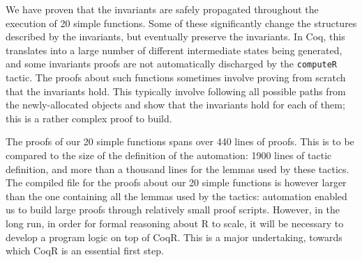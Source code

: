 \documentclass[
    sigplan,
    10pt,
    review, %
    natbib=false %
 ]{acmart}
\newcommand\et[1]{\todo[color=blue!20,size=\scriptsize]{#1}}
\newcommand\CoqR{CoqR}
\begin{document}
We have proven that the invariants are safely propagated throughout the execution of 20 simple functions.
Some of these significantly change the structures described by the invariants,
but eventually preserve the invariants. 
In Coq, this translates into a large number of different intermediate states being generated,
and some invariants proofs are not automatically discharged by the \texttt{computeR} tactic.
The proofs about such functions sometimes
involve proving from scratch that the invariants hold.
This typically involve following all possible paths
from the newly-allocated objects and show that the invariants hold for each of them; this is a rather complex proof to build.

The proofs of our 20 simple functions spans over 440 lines of proofs.
This is to be compared to the size of the definition of the automation:
1900 lines of tactic definition,
and more than a thousand lines for the lemmas used by these tactics.
The compiled file for the proofs about our 20 simple functions
is however larger than the one containing all the lemmas used by the tactics:
automation enabled us to build large proofs through relatively small proof scripts.
%
%
However, in the long run, in order for formal reasoning about R to scale, it will be necessary to develop a program logic on top of \CoqR.
This is a major undertaking, towards which \CoqR{} is an essential first step.

\end{document}
